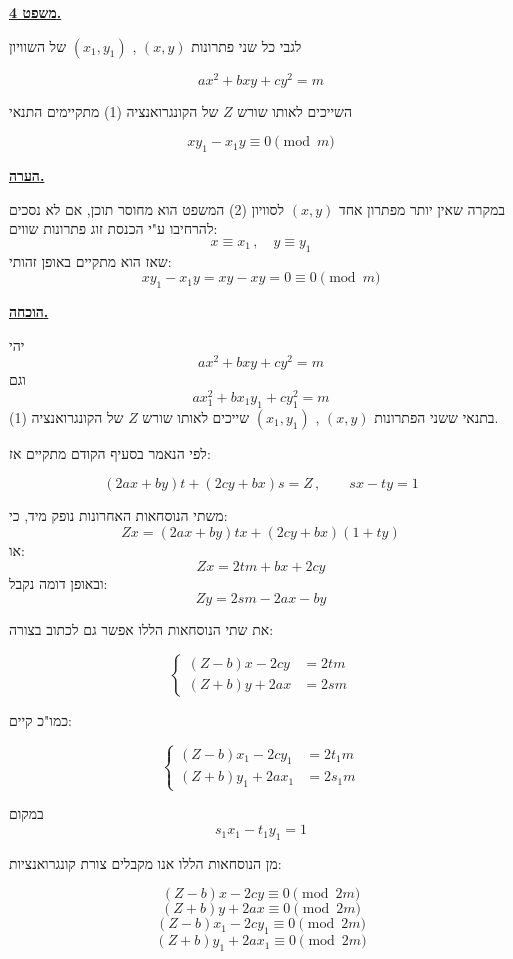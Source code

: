 \bigskip
\noindent\textbf{\underline{משפט 4.}}

\noindent לגבי כל שני פתרונות $(x,y)$ , $(x_1,y_1)$ של השוויון

\[ ax^2 + bxy + cy^2 = m \tag{2} \]

\noindent השייכים לאותו שורש $Z$ של הקונגרואנציה (1) מתקיימים התנאי

\[ xy_1 - x_1y \equiv 0 \pmod{m} \tag{3} \]

\bigskip
\noindent\textbf{\underline{הערה.}}

\noindent במקרה שאין יותר מפתרון אחד $(x,y)$ לסוויון (2) המשפט הוא מחוסר תוכן, אם לא נסכים להרחיבו ע"י הכנסת זוג פתרונות שווים:
\[ x \equiv x_1 \, , \quad y \equiv y_1 \]
\noindent שאז הוא מתקיים באופן זהותי:
\[ xy_1 - x_1y = xy - xy = 0 \equiv 0 \pmod{m} \]

\bigskip
\noindent\textbf{\underline{הוכחה.}}

\noindent יהי
\[ ax^2 + bxy + cy^2 = m \]
\noindent וגם
\[ ax_1^2 + bx_1y_1 + cy_1^2 = m \]
\noindent בתנאי ששני הפתרונות $(x,y)$ , $(x_1,y_1)$ שייכים לאותו שורש $Z$ של הקונגרואנציה (1).

\noindent לפי הנאמר בסעיף הקודם מתקיים אז:

\[ (2ax+by)t + (2cy+bx)s = Z \, , \qquad sx - ty = 1 \tag{4} \]

\noindent משתי הנוסחאות האחרונות נופק מיד, כי:
\[ Zx = (2ax+by)tx + (2cy+bx)(1+ty) \]
\noindent או:
\[ Zx = 2tm + bx + 2cy \tag{5} \]
\noindent ובאופן דומה נקבל:
\[ Zy = 2sm - 2ax - by \tag{6} \]

\noindent את שתי הנוסחאות הללו אפשר גם לכתוב בצורה:

\[ \left\{ \begin{aligned} (Z-b)x - 2cy &= 2tm \\ (Z+b)y + 2ax &= 2sm \end{aligned} \right. \tag{7} \]

\noindent כמו"כ קיים:

\[ \left\{ \begin{aligned} (Z-b)x_1 - 2cy_1 &= 2t_1m \\ (Z+b)y_1 + 2ax_1 &= 2s_1m \end{aligned} \right. \tag{8} \]

\noindent במקום
\[ s_1x_1 - t_1y_1 = 1 \]

\noindent מן הנוסחאות הללו אנו מקבלים צורת קונגרואנציות:

\[ (Z-b)x - 2cy \equiv 0 \pmod{2m} \tag{א} \]
\[ (Z+b)y + 2ax \equiv 0 \pmod{2m} \tag{ב} \]
\[ (Z-b)x_1 - 2cy_1 \equiv 0 \pmod{2m} \tag{ג} \]
\[ (Z+b)y_1 + 2ax_1 \equiv 0 \pmod{2m} \tag{ד} \]

